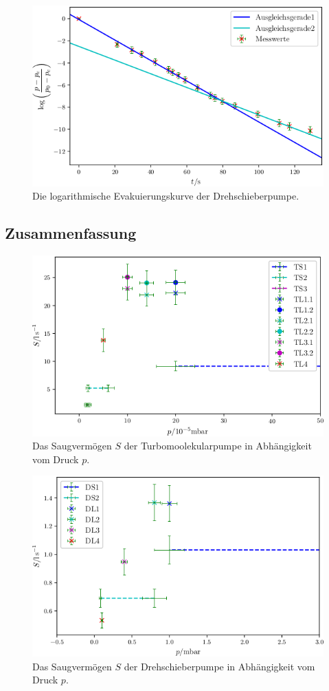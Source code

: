\begin{figure}
\centering
\includegraphics[width=\linewidth-70pt,height=\textheight-70pt,keepaspectratio]{content/images/DSL.png}
\caption{Die logarithmische Evakuierungskurve der Drehschieberpumpe.}
\label{fig:DSL}
\end{figure}

\subsection{Zusammenfassung}

\begin{figure}
\centering
\includegraphics[width=\linewidth-70pt,height=\textheight-70pt,keepaspectratio]{content/images/TGes.png}
\caption{Das Saugvermögen $S$ der Turbomoolekularpumpe in Abhängigkeit vom Druck $p$.}
\label{fig:TGes}
\end{figure}

\begin{figure}
\centering
\includegraphics[width=\linewidth-70pt,height=\textheight-70pt,keepaspectratio]{content/images/DGes.png}
\caption{Das Saugvermögen $S$ der Drehschieberpumpe in Abhängigkeit vom Druck $p$.}
\label{fig:DGes}
\end{figure}